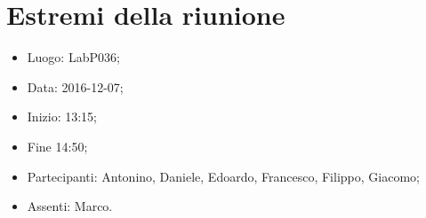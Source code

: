 \documentclass[../verbale-2016-12-07.tex]{subfiles}
\begin{document}
\section{Estremi della riunione}
	\begin{itemize}
		\item Luogo: LabP036;
		\item Data: 2016-12-07;
      \item Inizio: 13:15;
      \item Fine 14:50;
		\item Partecipanti: Antonino, Daniele, Edoardo, Francesco, Filippo, Giacomo;
      \item Assenti: Marco.
	\end{itemize}
\end{document}
